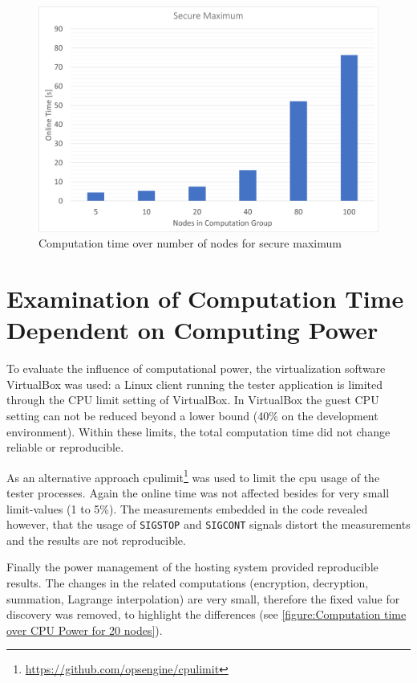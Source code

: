 \begin{figure}[!htbp] %
	\caption{Computation time over number of nodes for secure maximum} \label{figure:Computation time over number of nodes for secure maximum}
	\includegraphics[scale=1.0]{figures/eval_max.png}
\end{figure}

\section{Examination of Computation Time Dependent on Computing Power} \label{Examination of Computation Time Dependent on Computing Power}
%
To evaluate the influence of computational power, the virtualization software VirtualBox was used: a Linux client running the tester application is limited through the CPU limit setting of VirtualBox. In VirtualBox the guest CPU setting can not be reduced beyond a lower bound (40\% on the development environment). Within these limits, the total computation time did not change reliable or reproducible.

As an alternative approach cpulimit\footnote{\url{https://github.com/opsengine/cpulimit}} was used to limit the cpu usage of the tester processes. Again the online time was not affected besides for very small limit-values (1 to 5\%). The measurements embedded in the code revealed however, that the usage of \lstinline|SIGSTOP| and \lstinline|SIGCONT| signals distort the measurements and the results are not reproducible.

Finally the power management of the hosting system provided reproducible results. The changes in the related computations (encryption, decryption, summation, Lagrange interpolation) are very small, therefore the fixed value for discovery was removed, to highlight the differences (see \autoref{figure:Computation time over CPU Power for 20 nodes}).

